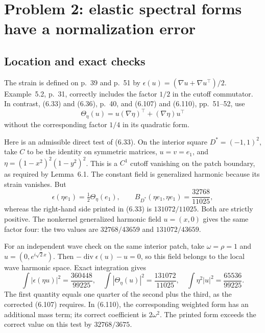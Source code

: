 \documentclass[10pt]{article}
\begin{document}
\section*{Problem 2: elastic spectral forms have a normalization error}
\subsection*{Location and exact checks}
The strain is defined on p. 39 and p. 51 by \(\epsilon(u)=(\nabla u+\nabla u^\top)/2\). Example 5.2, p. 31, correctly includes the factor \(1/2\) in the cutoff commutator. In contrast, (6.33) and (6.36), p. 40, and (6.107) and (6.110), pp. 51–52, use \[\Theta_\eta(u)=u(\nabla\eta)^\top+(\nabla\eta)u^\top\] without the corresponding factor \(1/4\) in its quadratic form.\par
Here is an admissible direct test of (6.33). On the interior square \(D^*=(-1,1)^2\), take \(C\) to be the identity on symmetric matrices, \(u=v=e_1\), and \(\eta=(1-x^2)^2(1-y^2)^2\). This is a \(C^1\) cutoff vanishing on the patch boundary, as required by Lemma 6.1. The constant field is generalized harmonic because its strain vanishes. But \[\epsilon(\eta e_1)=\tfrac12\Theta_\eta(e_1),\qquad
 B_{D^*}(\eta e_1,\eta e_1)=\frac{32768}{11025},\] whereas the right-hand side printed in (6.33) is \(131072/11025\). Both are strictly positive. The nonkernel generalized harmonic field \(u=(x,0)\) gives the same factor four: the two values are \(32768/43659\) and \(131072/43659\).\par
For an independent wave check on the same interior patch, take \(\omega=\rho=1\) and \(u=(0,e^{i\sqrt2 x})\). Then \(-\operatorname{div}\epsilon(u)-u=0\), so this field belongs to the local wave harmonic space. Exact integration gives \[\int|\epsilon(\eta u)|^2=\frac{360448}{99225},\quad
 \int|\Theta_\eta(u)|^2=\frac{131072}{11025},\quad
 \int\eta^2|u|^2=\frac{65536}{99225}.\] The first quantity equals one quarter of the second plus the third, as the corrected (6.107) requires. In (6.110), the corresponding weighted form has an additional mass term; its correct coefficient is \(2\omega^2\). The printed form exceeds the correct value on this test by \(32768/3675\).\par
\end{document}
